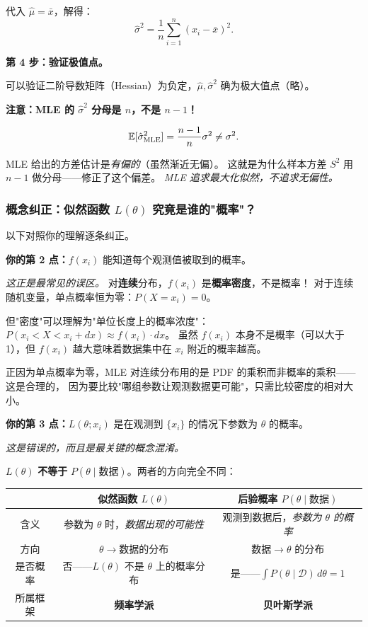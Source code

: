代入 $\hat{\mu} = \bar{x}$，解得：
\begin{equation}
    \boxed{\hat{\sigma}^2 = \frac{1}{n}\sum_{i=1}^{n}(x_i - \bar{x})^2}.
\end{equation}

\medskip
\textbf{第 4 步：验证极值点。}

可以验证二阶导数矩阵（Hessian）为负定，$\hat{\mu}, \hat{\sigma}^2$ 确为极大值点（略）。

\medskip
\textbf{注意：MLE 的 $\hat{\sigma}^2$ 分母是 $n$，不是 $n-1$！}

\begin{equation}
    \mathbb{E}[\hat{\sigma}^2_{\mathrm{MLE}}] = \frac{n-1}{n}\sigma^2 \neq \sigma^2.
\end{equation}

MLE 给出的方差估计是\emph{有偏的}（虽然渐近无偏）。
这就是为什么样本方差 $S^2$ 用 $n-1$ 做分母——修正了这个偏差。
\emph{MLE 追求最大化似然，不追求无偏性。}

\subsubsection{概念纠正：似然函数 $L(\theta)$ 究竟是谁的"概率"？}

以下对照你的理解逐条纠正。

\medskip
\textbf{你的第 2 点：}$f(x_i)$ 能知道每个观测值被取到的概率。

\emph{这正是最常见的误区。}
对\textbf{连续}分布，$f(x_i)$ 是\textbf{概率密度}，不是概率！
对于连续随机变量，单点概率恒为零：$P(X = x_i) = 0$。

但"密度"可以理解为"单位长度上的概率浓度"：$P(x_i < X < x_i + dx) \approx f(x_i) \cdot dx$。
虽然 $f(x_i)$ 本身不是概率（可以大于 1），但 $f(x_i)$ 越大意味着数据集中在 $x_i$ 附近的概率越高。

正因为单点概率为零，MLE 对连续分布用的是 PDF 的乘积而非概率的乘积——这是合理的，
因为要比较"哪组参数让观测数据更可能"，只需比较密度的相对大小。

\medskip
\textbf{你的第 3 点：}$L(\theta; x_i)$ 是在观测到 $\{x_i\}$ 的情况下参数为 $\theta$ 的概率。

\emph{这是错误的，而且是最关键的概念混淆。}

$L(\theta)$ \textbf{不等于} $P(\theta \mid \text{数据})$。两者的方向完全不同：

\begin{center}
\renewcommand{\arraystretch}{1.5}
\begin{tabular}{c|c|c}
\toprule
& \textbf{似然函数 $L(\theta)$} & \textbf{后验概率 $P(\theta \mid \text{数据})$} \\
\midrule
含义 & 参数为 $\theta$ 时，\emph{数据出现的可能性} & 观测到数据后，\emph{参数为 $\theta$ 的概率} \\
方向 & $\theta \to \text{数据的分布}$ & $\text{数据} \to \theta \text{ 的分布}$ \\
是否概率 & 否——$L(\theta)$ 不是 $\theta$ 上的概率分布 & 是——$\int P(\theta \mid \mathcal{D})\,d\theta = 1$ \\
所属框架 & \textbf{频率学派} & \textbf{贝叶斯学派} \\
\bottomrule
\end{tabular}
\end{center}

